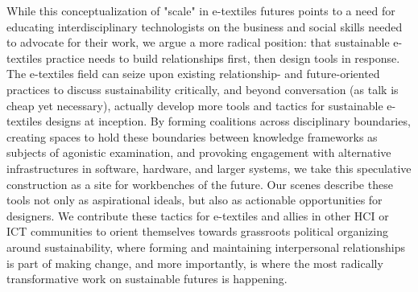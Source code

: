 While this conceptualization of "scale" in e-textiles futures points to a need for educating interdisciplinary technologists on the business and social skills needed to advocate for their work, we argue a more radical position: that sustainable e-textiles practice needs to build relationships first, then design tools in response. The e-textiles field can seize upon existing relationship- and future-oriented practices to discuss sustainability critically, and beyond conversation (as talk is cheap yet necessary), actually develop more tools and tactics for sustainable e-textiles designs at inception. By forming coalitions across disciplinary boundaries, creating spaces to hold these boundaries between knowledge frameworks as subjects of agonistic examination, and provoking engagement with alternative infrastructures in software, hardware, and larger systems, we take this speculative construction as a site for  workbenches of the future. Our scenes describe these tools not only as aspirational ideals, but also as actionable opportunities for designers.
We contribute these tactics for e-textiles and allies in other HCI or ICT communities to orient themselves towards grassroots political organizing around sustainability, where forming and maintaining interpersonal relationships is part of making change, and more importantly, is where the most radically transformative work on sustainable futures is happening.

